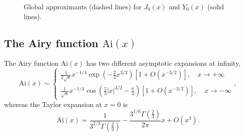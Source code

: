 \documentclass{llncs}
\begin{document}
%
\begin{figure}[htbp]


\caption{Global approximants (dashed lines) for $J_{0}\left(x\right)$ and
$Y_{0}\left(x\right)$ (solid lines).\label{fig:bessel0}}
\end{figure}



\subsection{The Airy function $\textrm{Ai}\left(x\right)$}

The Airy function $\textrm{Ai}\left(x\right)$ has two different asymptotic
expansions at infinity,\begin{equation}
\textrm{Ai}\left(x\right)\sim \left\{ \begin{array}{l}
 \frac{1}{2\sqrt{\pi }}x^{-1/4}\exp \left(-\frac{2}{3}x^{3/2}\right)\left[1+O\left(x^{-3/2}\right)\right],\quad x\rightarrow +\infty \\
 \frac{1}{\sqrt{\pi }}x^{-1/4}\cos \left(\frac{2}{3}\left|x\right|^{3/2}-\frac{\pi }{4}\right)\left[1+O\left(x^{-3/2}\right)\right],\quad x\rightarrow -\infty \end{array}
\right.,\end{equation}
whereas the Taylor expansion at $x=0$ is\begin{equation}
\textrm{Ai}\left(x\right)=\frac{1}{3^{2/3}\Gamma \left(\frac{2}{3}\right)}-\frac{3^{1/6}\Gamma \left(\frac{2}{3}\right)}{2\pi }x+O\left(x^{3}\right).\end{equation}
\end{document}
